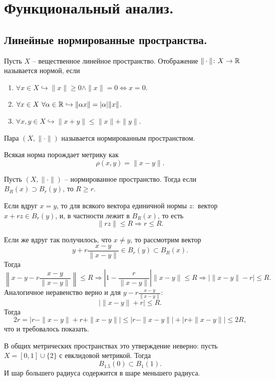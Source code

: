 \part{Функциональный анализ.}
\chapter{Линейные нормированные пространства.}
\begin{definition}
    Пусть $X$ -- вещественное линейное пространство.
    Отображение $\|\cdot\|\colon X \to \mathbb{R}$ называется нормой, если
    \begin{enumerate}
        \item $\forall x \in X \hookrightarrow \|x\| \geq 0 \wedge \|x\| = 0 \Leftrightarrow x = 0$.
        \item $\forall x \in X \ \forall \alpha \in \mathbb{R} \hookrightarrow \|\alpha x\| = |\alpha|\|x\|$.
        \item $\forall x, y \in X \hookrightarrow \|x + y\| \leq \|x\| + \|y\|$.
    \end{enumerate}

    Пара $(X, \|\cdot\|)$ называется нормированным пространством.
\end{definition}
\begin{note}
    Всякая норма порождает метрику как
    \[
        \rho(x, y) = \|x - y\|.
    \]
\end{note}
\begin{example}
    Пусть $(X, \|\cdot\|)$ -- нормированное пространство.
    Тогда если $B_R(x) \supset B_r(y)$, то $R \geq r$.

    Если вдруг $x = y$, то для всякого вектора единичной нормы $z\colon$ вектор $x + rz \in B_r(y)$, и, в частности лежит в $B_R(x)$, то есть
    \[
        \|rz\| \leq R \Rightarrow r \leq R.
    \]

    Если же вдруг так получилось, что $x \neq y$, то рассмотрим вектор
    \[
        y + r \frac{x - y}{\|x - y\|} \in B_r(y) \subset B_R(x).
    \]
    Тогда
    \[
        \left\|x - y - r \frac{x - y}{\|x - y\|}\right\| \leq R \Rightarrow \left|1 - \frac{r}{\|x - y\|}\right|\|x - y\| \leq R \Rightarrow |\|x - y\| - r| \leq R.
    \]
    Аналогичное неравенство верно и для $y - r \frac{x - y}{\|x - y\|}\colon$
    \[
        |\|x - y\| + r| \leq R.
    \]
    Тогда
    \[
        2r = |r - \|x - y\| + r + \|x - y\|| \leq |r - \|x - y\|| + |r + \|x - y\|| \leq 2R,
    \]
    что и требовалось показать.
\end{example}
\begin{example}
    В общих метрических пространствах это утверждение неверно: пусть $X = [0, 1] \cup \{2\}$ с евклидовой метрикой.
    Тогда
    \[
        B_{1.5}(0) \subset B_{1}(1).
    \]
    И шар большего радиуса содержится в шаре меньшего радиуса.
\end{example}
